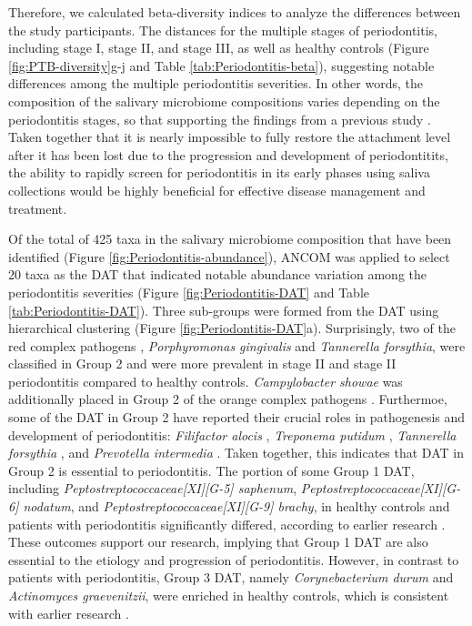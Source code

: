 \documentclass[11pt, a4paper, onecolumn, oneside]{report}
\begin{document}
            Therefore, we calculated beta-diversity indices to analyze the differences between the study participants. The distances for the multiple stages of periodontitis, including stage I, stage II, and stage III, as well as healthy controls (Figure \ref{fig:PTB-diversity}g-j and Table \ref{tab:Periodontitis-beta}), suggesting notable differences among the multiple periodontitis severities. In other words, the composition of the salivary microbiome compositions varies depending on the periodontitis stages, so that supporting the findings from a previous study \cite{Periodontitis-10}. Taken together that it is nearly impossible to fully restore the attachment level after it has been lost due to the progression and development of periodontitits, the ability to rapidly screen for periodontitis in its early phases using saliva collections would be highly beneficial for effective disease management and treatment.

            Of the total of 425 taxa in the salivary microbiome composition that have been identified (Figure \ref{fig:Periodontitis-abundance}), ANCOM was applied to select 20 taxa as the DAT that indicated notable abundance variation among the periodontitis severities (Figure \ref{fig:Periodontitis-DAT} and Table \ref{tab:Periodontitis-DAT}). Three sub-groups were formed from the DAT using hierarchical clustering (Figure \ref{fig:Periodontitis-DAT}a). Surprisingly, two of the red complex pathogens \cite{Periodontitis-22}, \textit{Porphyromonas gingivalis} and \textit{Tannerella forsythia}, were classified in Group 2 and were more prevalent in stage II and stage II periodontitis compared to healthy controls. \textit{Campylobacter showae} was additionally placed in Group 2 of the orange complex pathogens \cite{Periodontitis-23}. Furthermoe, some of the DAT in Group 2 have reported their crucial roles in pathogenesis and development of periodontitis: \textit{Filifactor alocis} \cite{Periodontitis-24}, \textit{Treponema putidum} \cite{Periodontitis-25}, \textit{Tannerella forsythia} \cite{Periodontitis-26, Periodontitis-27}, and \textit{Prevotella intermedia} \cite{Periodontitis-28}. Taken together, this indicates that DAT in Group 2 is essential to periodontitis. The portion of some Group 1 DAT, including \textit{Peptostreptococcaceae[XI][G-5] saphenum}, \textit{Peptostreptococcaceae[XI][G-6] nodatum}, and \textit{Peptostreptococcaceae[XI][G-9] brachy}, in healthy controls and patients with periodontitis significantly differed, according to earlier research \cite{Periodontitis-8}. These outcomes support our research, implying that Group 1 DAT are also essential to the etiology and progression of periodontitis. However, in contrast to patients with periodontitis, Group 3 DAT, namely \textit{Corynebacterium durum} and \textit{Actinomyces graevenitzii},  were enriched in healthy controls, which is consistent with earlier research \cite{Periodontitis-29, Periodontitis-30}.
\end{document}
